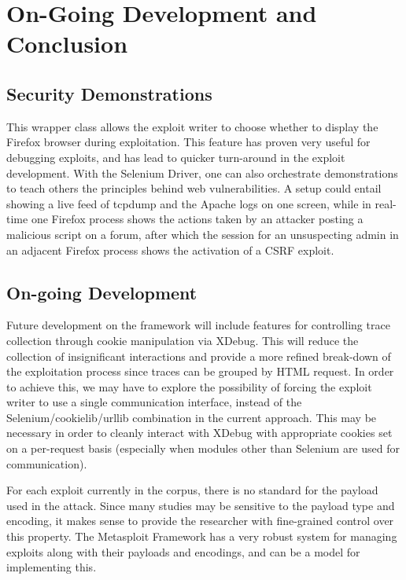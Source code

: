 \documentclass[letterpaper,twocolumn,10pt]{article}
\begin{document}
\section {On-Going Development and Conclusion}

\subsection{Security Demonstrations}


This wrapper class allows the exploit writer to choose whether to display the Firefox browser during exploitation. This feature has proven very useful for debugging exploits, and has lead to quicker turn-around in the exploit development. With the Selenium Driver, one can also orchestrate demonstrations to teach others the principles behind web vulnerabilities.  A setup could entail showing a live feed of tcpdump and the Apache logs on one screen, while in real-time one Firefox process shows the actions taken by an attacker posting a malicious script on a forum, after which the session for an unsuspecting admin in an adjacent Firefox process shows the activation of a CSRF exploit. 

\subsection{On-going Development}
  Future development on the framework will include features for controlling trace collection through cookie manipulation via XDebug. This will reduce the collection of insignificant interactions and provide a more refined break-down of the exploitation process since traces can be grouped by HTML request. In order to achieve this, we may have to explore the possibility of forcing the exploit writer to use a single communication interface, instead of the Selenium/cookielib/urllib combination in the current approach. This may be necessary in order to cleanly interact with XDebug with appropriate cookies set on a per-request basis (especially when modules other than Selenium are used for communication).\par
For each exploit currently in the corpus, there is no standard for the payload used in the attack. Since many studies may be sensitive to the payload type and encoding, it makes sense to provide the researcher with fine-grained control over this property. The Metasploit Framework has a very robust system for managing exploits along with their payloads and encodings, and can be a model for implementing this.
\end{document}
